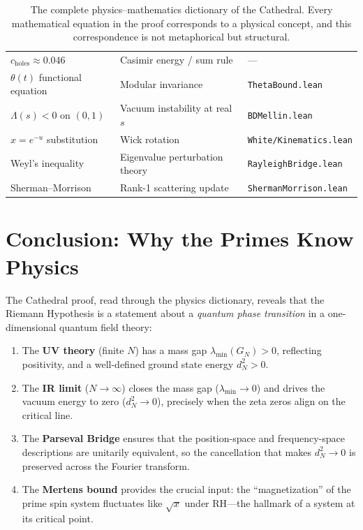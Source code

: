 \documentclass[11pt,a4paper]{article}
\theoremstyle{definition}
\newcommand{\lean}[1]{\texttt{#1}}
\begin{document}
\begin{table}[h]
\begin{tabular}{@{}lll@{}}
$c_{\text{holes}} \approx 0.046$ & Casimir energy / sum rule & --- \\
$\theta(t)$ functional equation & Modular invariance & \lean{ThetaBound.lean} \\
$\Lambda(s) < 0$ on $(0,1)$ & Vacuum instability at real $s$ & \lean{BDMellin.lean} \\
$x = e^{-u}$ substitution & Wick rotation & \lean{White/Kinematics.lean} \\
Weyl's inequality & Eigenvalue perturbation theory & \lean{RayleighBridge.lean} \\
Sherman--Morrison & Rank-1 scattering update & \lean{ShermanMorrison.lean} \\
\bottomrule
\end{tabular}
\caption{The complete physics--mathematics dictionary of the Cathedral.
Every mathematical equation in the proof corresponds to a physical
concept, and this correspondence is not metaphorical but structural.}
\label{tab:dictionary}
\end{table}

\section{Conclusion: Why the Primes Know Physics}

The Cathedral proof, read through the physics dictionary, reveals that
the Riemann Hypothesis is a statement about a \emph{quantum phase
transition} in a one-dimensional quantum field theory:

\begin{enumerate}
  \item The \textbf{UV theory} (finite $N$) has a mass gap
    $\lambda_{\min}(G_N) > 0$, reflecting positivity, and a well-defined
    ground state energy $d_N^2 > 0$.

  \item The \textbf{IR limit} ($N \to \infty$) closes the mass gap
    ($\lambda_{\min} \to 0$) and drives the vacuum energy to zero
    ($d_N^2 \to 0$), precisely when the zeta zeros align on the
    critical line.

  \item The \textbf{Parseval Bridge} ensures that the position-space
    and frequency-space descriptions are unitarily equivalent, so the
    cancellation that makes $d_N^2 \to 0$ is preserved across the
    Fourier transform.

  \item The \textbf{Mertens bound} provides the crucial input: the
    ``magnetization'' of the prime spin system fluctuates like
    $\sqrt{x}$ under RH---the hallmark of a system at its critical
    point.
\end{enumerate}
\end{document}

